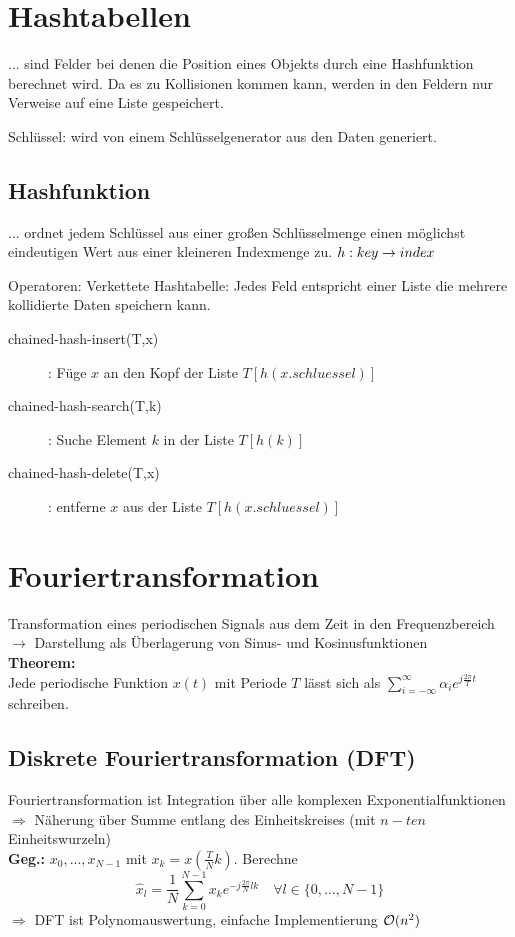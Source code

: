 \documentclass[fs, footer]{latex4ei}
\begin{document}
\begin{multicols*}{4}
{{\section{Hashtabellen}
	... sind Felder bei denen die Position eines Objekts durch eine Hashfunktion berechnet wird. Da es zu Kollisionen kommen kann, werden in den Feldern nur Verweise auf eine Liste gespeichert.

	Schlüssel: wird von einem Schlüsselgenerator aus den Daten generiert. 
\subsection{Hashfunktion}
	... ordnet jedem Schlüssel aus einer großen Schlüsselmenge einen möglichst eindeutigen Wert aus einer kleineren Indexmenge zu.
	$h: key \rightarrow index$
	
Operatoren:
Verkettete Hashtabelle: Jedes Feld entspricht einer Liste die mehrere kollidierte Daten speichern kann. 
\begin{description}
	\item[chained-hash-insert(T,x)]: Füge $x$ an den Kopf der Liste $T[ h(x.schluessel)]$
	\item[chained-hash-search(T,k)]: Suche Element $k$ in der Liste $T[ h(k) ]$
	\item[chained-hash-delete(T,x)]: entferne $x$ aus der Liste $T[h(x.schluessel)]$
\end{description}

\section{Fouriertransformation}
Transformation eines periodischen Signals aus dem Zeit in den Frequenzbereich $\rightarrow$ Darstellung als Überlagerung von Sinus- und Kosinusfunktionen\\
\textbf{Theorem:}\\
Jede periodische Funktion $x(t)$ mit Periode $T$ lässt sich als $\sum_{i=-\infty}^\infty \alpha_i e^{j\frac{2\pi}{T}t}$ schreiben.
\subsection{Diskrete Fouriertransformation (DFT)}
Fouriertransformation ist Integration über alle komplexen Exponentialfunktionen $\Rightarrow$ Näherung über Summe entlang des Einheitskreises (mit $n-ten$ Einheitswurzeln)\\
\textbf{Geg.:} $x_0, ..., x_{N-1}$ mit $x_k = x(\frac{T}{N}k)$.
Berechne \[\hat{x}_l = \dfrac{1}{N} \sum_{k=0}^{N-1}x_ke^{-j\frac{2\pi}{N}lk}\quad\forall l \in \{0,...,N-1\}\]
$\Rightarrow$ DFT ist Polynomauswertung, einfache Implementierung $\operatorname{\mathcal O}(n^2)$
}}
\end{multicols*}
\end{document}
